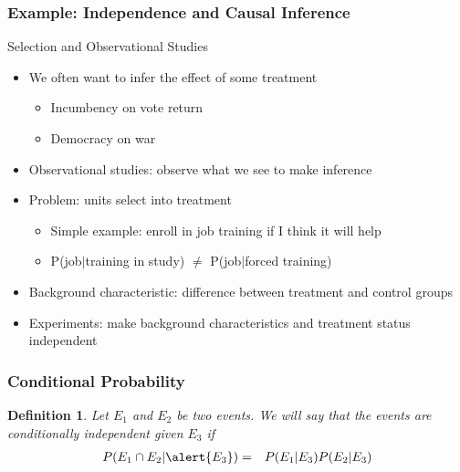 \documentclass[handout]{beamer}
\newtheorem{defn}{Definition}
\numberwithin{equation}{section}
\begin{document}
\begin{frame}
\frametitle{Example: Independence and Causal Inference} 

Selection and Observational Studies
\begin{itemize}
\item[-] We often want to infer the effect of some treatment 
\begin{itemize}
\item[-] Incumbency on vote return 
\item[-] Democracy on war
\end{itemize}
\item[-] Observational studies: observe what we see to make inference 
\item[-] Problem: units select into treatment 
\begin{itemize}
\item[-] Simple example: enroll in job training if I think it will help 
\item[-] P(job$|$training in study) $\neq$ P(job$|$forced training) 
\end{itemize}
\item[-] \alert{Background characteristic}: difference between
  treatment and control groups
\item[-] \alert{Experiments}: make background characteristics and treatment status
  independent 
\end{itemize}


\end{frame}


\begin{frame}
\frametitle{Conditional Probability}

\begin{defn}
Let $E_{1}$ and $E_{2}$ be two events.  We will say that the events are conditionally independent given $E_{3}$ if 
\begin{eqnarray}
P(E_{1} \cap E_{2} | \alert{E_{3}}) & = & P(E_{1} | E_{3} ) P(E_{2} | E_{3} ) \nonumber 
\end{eqnarray}


\end{defn}



\end{frame}
\end{document}
